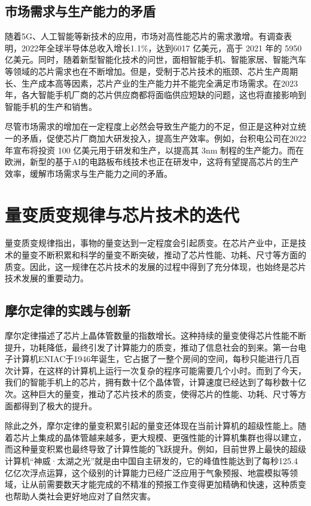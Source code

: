 \documentclass[12pt,hyperref,a4paper,UTF8]{ctexart}
\begin{document}
\subsection{市场需求与生产能力的矛盾}

随着5G、人工智能等新技术的应用，市场对高性能芯片的需求激增。有调查表明，2022年全球半导体总收入增长1.1\%，达到6017 亿美元，高于 2021 年的 5950 亿美元。同时，随着新型智能化技术的问世，面相智能手机、智能家居、智能汽车等领域的芯片需求也在不断增加。但是，受制于芯片技术的瓶颈、芯片生产周期长、生产成本高等因素，芯片产业的生产能力并不能完全满足市场需求。在2023年，各大智能手机厂商的芯片供应商都将面临供应短缺的问题，这也将直接影响到智能手机的生产和销售。

尽管市场需求的增加在一定程度上必然会导致生产能力的不足，但正是这种对立统一的矛盾，促使芯片厂商加大研发投入，提高生产效率。例如，台积电公司在2022年宣布将投资 100 亿美元用于研发和生产，以提高其 3nm 制程的生产能力。而在欧洲，新型的基于AI的电路板布线技术也正在研发中，这将有望提高芯片的生产效率，缓解市场需求与生产能力之间的矛盾。

\section{量变质变规律与芯片技术的迭代}

量变质变规律指出，事物的量变达到一定程度会引起质变。在芯片产业中，正是技术的量变不断积累和科学的量变不断突破，推动了芯片性能、功耗、尺寸等方面的质变。因此，这一规律在芯片技术的发展的过程中得到了充分体现，也始终是芯片技术发展的重要动力。

\subsection{摩尔定律的实践与创新}

摩尔定律描述了芯片上晶体管数量的指数增长。这种持续的量变使得芯片性能不断提升，功耗降低，最终引发了计算能力的质变，推动了信息社会的到来。第一台电子计算机ENIAC于1946年诞生，它占据了一整个房间的空间，每秒只能进行几百次计算，在这样的计算机上运行一次复杂的程序可能需要几个小时。而到了今天，我们的智能手机上的芯片，拥有数十亿个晶体管，计算速度已经达到了每秒数十亿次。这种巨大的量变，推动了芯片技术的质变，使得芯片的性能、功耗、尺寸等方面都得到了极大的提升。   

除此之外，摩尔定律的量变积累引起的量变还体现在当前计算机的超级性能上。随着芯片上集成的晶体管越来越多，更大规模、更强性能的计算机集群也得以建立，而这种量变积累也最终导致了计算性能的飞跃提升。例如，目前世界上最快的超级计算机“神威·太湖之光”就是由中国自主研发的，它的峰值性能达到了每秒125.4 亿亿次浮点运算，这个级别的计算能力已经广泛应用于气象预报、地震模拟等领域，让从前需要数天才能完成的不精准的预报工作变得更加精确和快速，这种质变也帮助人类社会更好地应对了自然灾害。
\end{document}

